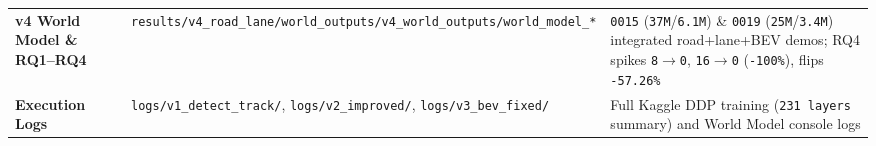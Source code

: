 \documentclass[10.5pt,a4paper]{article}
\begin{document}
\begin{footnotesize}
\begin{longtable}{>{\raggedright\arraybackslash}p{} >{\raggedright\arraybackslash}p{} >{\raggedright\arraybackslash}p{}}
\textbf{v4 World Model \& RQ1--RQ4} & \texttt{results/\allowbreak{}v4\_\allowbreak{}road\_\allowbreak{}lane/\allowbreak{}world\_\allowbreak{}outputs/\allowbreak{}v4\_\allowbreak{}world\_\allowbreak{}outputs/\allowbreak{}world\_\allowbreak{}model\_\allowbreak{}*} & \texttt{0015} (\texttt{37M}/\texttt{6.\allowbreak{}1M}) \& \texttt{0019} (\texttt{25M}/\texttt{3.\allowbreak{}4M}) integrated road+lane+BEV demos; RQ4 spikes \texttt{8$\rightarrow$0}, \texttt{16$\rightarrow$0} (\texttt{-\allowbreak{}100\%}), flips \texttt{-\allowbreak{}57.\allowbreak{}26\%} \\
\textbf{Execution Logs} & \texttt{logs/\allowbreak{}v1\_\allowbreak{}detect\_\allowbreak{}track/\allowbreak{}}, \texttt{logs/\allowbreak{}v2\_\allowbreak{}improved/\allowbreak{}}, \texttt{logs/\allowbreak{}v3\_\allowbreak{}bev\_\allowbreak{}fixed/\allowbreak{}} & Full Kaggle DDP training (\texttt{231 layers} summary) and World Model console logs \\
\end{longtable}
\end{footnotesize}

\newpage
\end{document}
